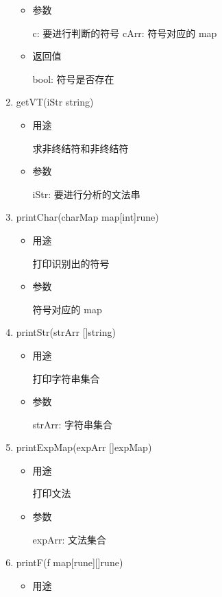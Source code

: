 \documentclass[fontset=none,UTF8,a4paper,zihao=-4]{ctexart}
\begin{document}
\begin{enumerate}
\begin{itemize}
\item 参数

c:    要进行判断的符号
cArr: 符号对应的 map

\item 返回值

bool: 符号是否存在
\end{itemize}

\item getVT(iStr string)

\begin{itemize}
\item 用途

求非终结符和非终结符

\item 参数

iStr: 要进行分析的文法串
\end{itemize}

\item printChar(charMap map[int]rune)

\begin{itemize}
\item 用途

打印识别出的符号

\item 参数

符号对应的 map
\end{itemize}

\item printStr(strArr []string)

\begin{itemize}
\item 用途

打印字符串集合

\item 参数

strArr: 字符串集合
\end{itemize}

\item printExpMap(expArr []expMap)

\begin{itemize}
\item 用途

打印文法

\item 参数

expArr: 文法集合
\end{itemize}

\item printF(f map[rune][]rune)

\begin{itemize}
\item 用途


\end{itemize}
\end{enumerate}
\end{document}
